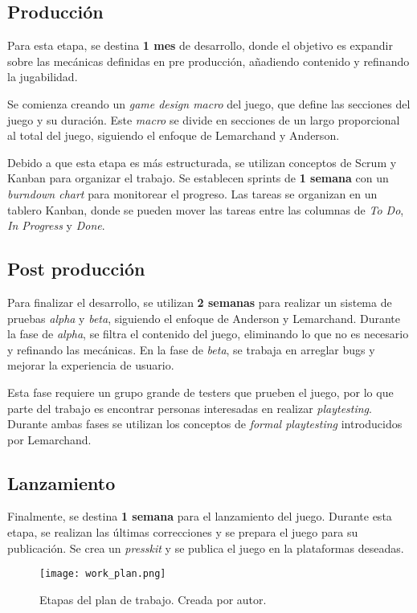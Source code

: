 \subsection{Producción}
%
\par Para esta etapa, se destina \textbf{1 mes} de desarrollo, donde el objetivo es expandir sobre las mecánicas definidas en pre producción, añadiendo contenido y refinando la jugabilidad.
\par Se comienza creando un \textit{game design macro} del juego, que define las secciones del juego y su duración. Este \textit{macro} se divide en secciones de un largo proporcional al total del juego, siguiendo el enfoque de Lemarchand y Anderson.
\par Debido a que esta etapa es más estructurada, se utilizan conceptos de Scrum y Kanban para organizar el trabajo. Se establecen sprints de \textbf{1 semana} con un \textit{burndown chart} para monitorear el progreso. Las tareas se organizan en un tablero Kanban, donde se pueden mover las tareas entre las columnas de \textit{To Do}, \textit{In Progress} y \textit{Done}.
%
%
\subsection{Post producción}
%
\par Para finalizar el desarrollo, se utilizan \textbf{2 semanas} para realizar un sistema de pruebas \textit{alpha} y \textit{beta}, siguiendo el enfoque de Anderson y Lemarchand. Durante la fase de \textit{alpha}, se filtra el contenido del juego, eliminando lo que no es necesario y refinando las mecánicas. En la fase de \textit{beta}, se trabaja en arreglar bugs y mejorar la experiencia de usuario.
\par Esta fase requiere un grupo grande de testers que prueben el juego, por lo que parte del trabajo es encontrar personas interesadas en realizar \textit{playtesting}. Durante ambas fases se utilizan los conceptos de \textit{formal playtesting} introducidos por Lemarchand.
%
%
\subsection{Lanzamiento}
\par Finalmente, se destina \textbf{1 semana} para el lanzamiento del juego. Durante esta etapa, se realizan las últimas correcciones y se prepara el juego para su publicación. Se crea un \textit{presskit} y se publica el juego en la plataformas deseadas.
%
\begin{figure}[H]
  \centering
  \texttt{[image: work\_plan.png]}
  \caption{Etapas del plan de trabajo. Creada por autor.}
  \label{fig:x plan de trabajo} 
\end{figure}
%